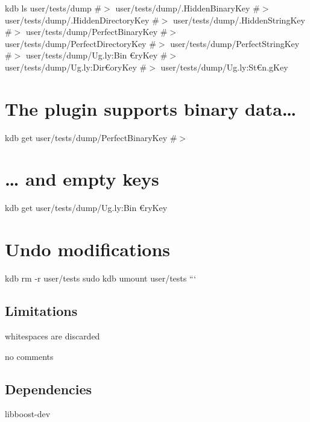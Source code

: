 kdb ls user/tests/dump \#$>$ user/tests/dump/.Hidden\+Binary\+Key \#$>$ user/tests/dump/.Hidden\+Directory\+Key \#$>$ user/tests/dump/.Hidden\+String\+Key \#$>$ user/tests/dump/\+Perfect\+Binary\+Key \#$>$ user/tests/dump/\+Perfect\+Directory\+Key \#$>$ user/tests/dump/\+Perfect\+String\+Key \#$>$ user/tests/dump/\+Ug.\+ly\+:Bin{\itshape } €ry\+Key \#$>$ user/tests/dump/\+Ug.\+ly\+:Dir€ory\+Key \#$>$ user/tests/dump/\+Ug.\+ly\+:St€n.\+g\+Key

\section*{The plugin supports binary data…}

kdb get user/tests/dump/\+Perfect\+Binary\+Key \#$>$ 

\section*{… and empty keys}

kdb get user/tests/dump/\+Ug.\+ly\+:Bin{\itshape } €ry\+Key

\section*{Undo modifications}

kdb rm -\/r user/tests sudo kdb umount user/tests ```

\subsection*{Limitations}


\begin{DoxyItemize}
\item whitespaces are discarded
\item no comments
\end{DoxyItemize}

\subsection*{Dependencies}


\begin{DoxyItemize}
\item {\ttfamily libboost-\/dev} 
\end{DoxyItemize}